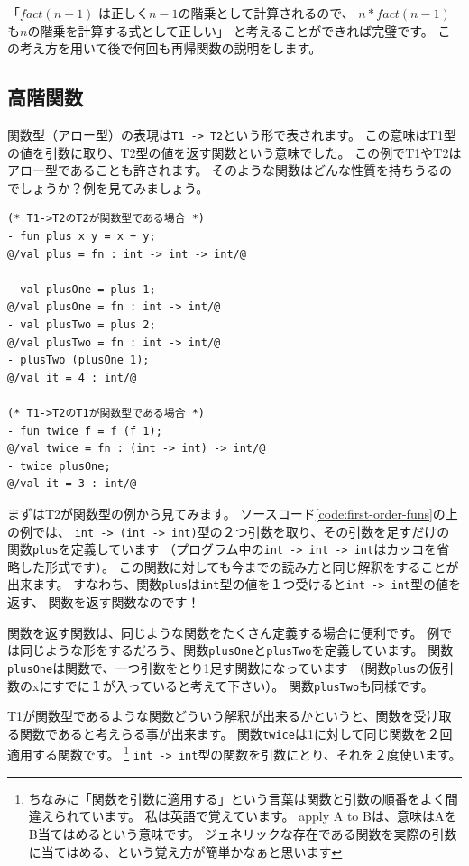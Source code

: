 \documentclass[11pt,a4paper]{article}
\begin{document}
「$fact (n - 1)$ は正しく$n - 1$の階乗として計算されるので、
$n * fact (n - 1)$も$n$の階乗を計算する式として正しい」
と考えることができれば完璧です。
この考え方を用いて後で何回も再帰関数の説明をします。

\subsection{高階関数}
関数型（アロー型）の表現は\lstinline{T1 -> T2}という形で表されます。
この意味はT1型の値を引数に取り、T2型の値を返す関数という意味でした。
この例でT1やT2はアロー型であることも許されます。
そのような関数はどんな性質を持ちうるのでしょうか？例を見てみましょう。

\begin{lstlisting}[caption=第一級関数,label=code:first-order-funs]
(* T1->T2のT2が関数型である場合 *)
- fun plus x y = x + y;
@/val plus = fn : int -> int -> int/@

- val plusOne = plus 1;
@/val plusOne = fn : int -> int/@
- val plusTwo = plus 2;
@/val plusTwo = fn : int -> int/@
- plusTwo (plusOne 1);
@/val it = 4 : int/@

(* T1->T2のT1が関数型である場合 *)
- fun twice f = f (f 1);
@/val twice = fn : (int -> int) -> int/@
- twice plusOne;
@/val it = 3 : int/@
\end{lstlisting}

まずはT2が関数型の例から見てみます。
ソースコード\ref{code:first-order-funs}の上の例では、
\lstinline{int -> (int -> int)}型の２つ引数を取り、その引数を足すだけの関数\lstinline{plus}を定義しています
（プログラム中の\lstinline{int -> int -> int}はカッコを省略した形式です）。
この関数に対しても今までの読み方と同じ解釈をすることが出来ます。
すなわち、関数\lstinline{plus}は\lstinline{int}型の値を１つ受けると\lstinline{int -> int}型の値を返す、
関数を返す関数なのです！

関数を返す関数は、同じような関数をたくさん定義する場合に便利です。
例では同じような形をするだろう、関数\lstinline{plusOne}と\lstinline{plusTwo}を定義しています。
関数\lstinline{plusOne}は関数で、一つ引数をとり1足す関数になっています
（関数\lstinline{plus}の仮引数のxにすでに１が入っていると考えて下さい）。
関数\lstinline{plusTwo}も同様です。

T1が関数型であるような関数どういう解釈が出来るかというと、関数を受け取る関数であると考えらる事が出来ます。
関数\lstinline{twice}は1に対して同じ関数を２回適用する関数です。
\footnote{
ちなみに「関数を引数に適用する」という言葉は関数と引数の順番をよく間違えられています。
私は英語で覚えています。
apply A to Bは、意味はAをB当てはめるという意味です。
ジェネリックな存在である関数を実際の引数に当てはめる、という覚え方が簡単かなぁと思います}
\lstinline{int -> int}型の関数を引数にとり、それを２度使います。
\end{document}
